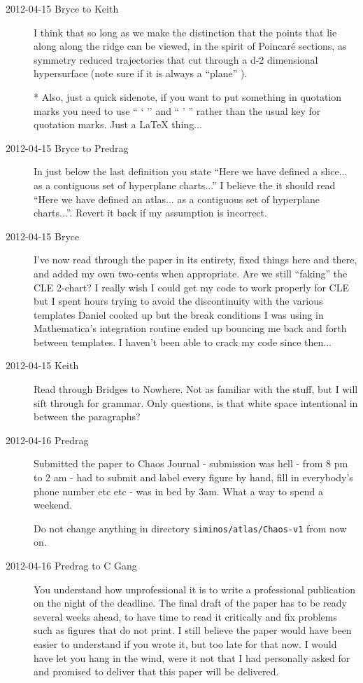 \begin{description}
\item[2012-04-15 Bryce to Keith] I think that so long as we make the distinction that the points that lie along along the ridge can be viewed, in the spirit of Poincar\'{e} sections, as symmetry reduced trajectories that cut through a d-2 dimensional hypersurface (note sure if it is always a ``plane'' ).

* Also, just a quick sidenote, if you want to put something in quotation marks you need to use `` ` '' and `` ' '' rather than the usual key for quotation marks. Just a LaTeX thing...

\item[2012-04-15 Bryce to Predrag] In  just below the last definition you state ``Here we have defined a slice... as a contiguous set of hyperplane charts...'' I believe the it should read ``Here we have defined an atlas... as a contiguous set of hyperplane charts...''. Revert it back if my assumption is incorrect.

\item[2012-04-15 Bryce] I've now read through the paper in its entirety, fixed things here and there, and added my own two-cents when appropriate. Are we still ``faking'' the CLE 2-chart? I really wish I could get my code to work properly for CLE but I spent hours trying to avoid the discontinuity with the various templates Daniel cooked up but the break conditions I was using in Mathematica's integration routine ended up bouncing me back and forth between templates. I haven't been able to crack my code since then...

\item[2012-04-15 Keith] Read through Bridges to Nowhere.  Not as familiar with the stuff, but I will sift through for grammar.  Only questions, is that white space intentional in between the paragraphs?

\item[2012-04-16 Predrag] Submitted the paper to Chaos Journal -
submission was hell - from 8 pm to 2 am - had to submit and label every
figure by hand, fill in everybody's phone number etc etc - was in bed by
3am. What a way to spend a weekend.

Do not change anything in directory \texttt{siminos/atlas/Chaos-v1} from
now on.

\item[2012-04-16 Predrag to C Gang]
You understand how unprofessional it is to write a professional
publication on the night of the deadline. The final draft of the paper
has to be ready several weeks ahead, to have time to read it critically
and fix problems such as figures that do not print. I still believe the
paper would have been easier to understand if you wrote it, but too late
for that now. I would have let you hang in the wind, were it not that I
had personally asked for and promised to deliver that this paper will be
delivered.


\end{description}
